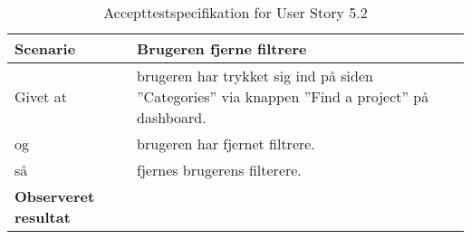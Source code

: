 \begin{table}[H]
	\centering
	\caption{Accepttestspecifikation for User Story 5.2 }
	\begin{tabular}{p{6cm}|p{6cm}}
		\hline
		\textbf{Scenarie} & Brugeren fjerne filtrere\\[10px]
		\hline
        Givet at & brugeren har trykket sig ind på siden ''Categories'' via knappen ''Find a project'' på dashboard.\\
        \hline
        og & brugeren har fjernet filtrere.\\
        \hline
        så & fjernes brugerens filterere.\\
		\hline
		\rowcolor{white}
		\textbf{Observeret resultat} & \\
		\hline
	\end{tabular}
\end{table}